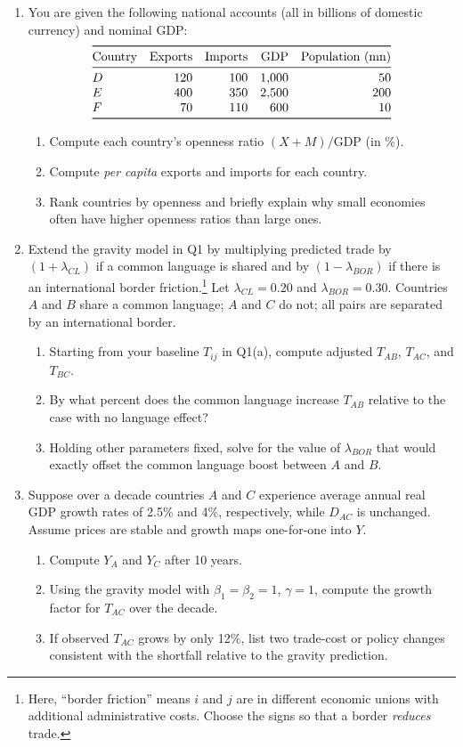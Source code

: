 \documentclass[11pt]{article}
\begin{document}
\begin{enumerate}[leftmargin=*, resume]
\item
You are given the following national accounts (all in billions of domestic currency) and nominal GDP:
\[
\begin{array}{@{}lrrrr@{}}
\toprule
\text{Country} & \text{Exports} & \text{Imports} & \text{GDP} & \text{Population (mn)}\\
\midrule
D & 120 & 100 & 1{,}000 & 50\\
E & 400 & 350 & 2{,}500 & 200\\
F & 70 & 110 & \phantom{0}600 & 10\\
\bottomrule
\end{array}
\]
\begin{enumerate}
\item Compute each country's openness ratio $(X+M)/\text{GDP}$ (in \%).
\item Compute \emph{per capita} exports and imports for each country.
\item Rank countries by openness and briefly explain why small economies often have higher openness ratios than large ones.
\end{enumerate}

\item 
Extend the gravity model in Q1 by multiplying predicted trade by $(1+\lambda_{CL})$ if a common language is shared and by $(1-\lambda_{BOR})$ if there is an international border friction.\footnote{Here, ``border friction'' means $i$ and $j$ are in different economic unions with additional administrative costs. Choose the signs so that a border \emph{reduces} trade.}
Let $\lambda_{CL}=0.20$ and $\lambda_{BOR}=0.30$. Countries $A$ and $B$ share a common language; $A$ and $C$ do not; all pairs are separated by an international border.
\begin{enumerate}
\item Starting from your baseline $T_{ij}$ in Q1(a), compute adjusted $T_{AB}$, $T_{AC}$, and $T_{BC}$.
\item By what percent does the common language increase $T_{AB}$ relative to the case with no language effect?
\item Holding other parameters fixed, solve for the value of $\lambda_{BOR}$ that would exactly offset the common language boost between $A$ and $B$.
\end{enumerate}

\item 
Suppose over a decade countries $A$ and $C$ experience average annual real GDP growth rates of 2.5\% and 4\%, respectively, while $D_{AC}$ is unchanged. Assume prices are stable and growth maps one-for-one into $Y$.
\begin{enumerate}
\item Compute $Y_A$ and $Y_C$ after 10 years.
\item Using the gravity model with $\beta_1=\beta_2=1$, $\gamma=1$, compute the growth factor for $T_{AC}$ over the decade.
\item If observed $T_{AC}$ grows by only 12\%, list two trade-cost or policy changes consistent with the shortfall relative to the gravity prediction.
\end{enumerate}
\end{enumerate}
\end{document}
